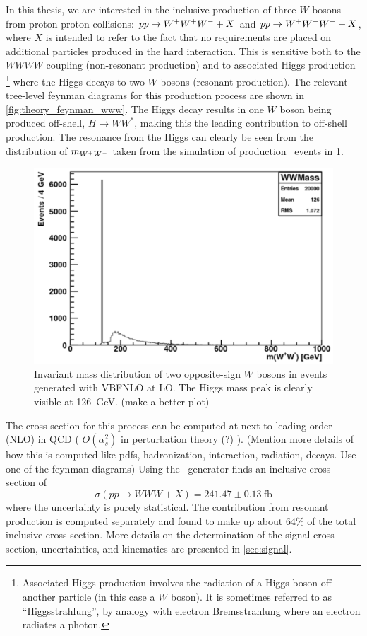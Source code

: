 In this thesis, we are interested in the inclusive production of three
$W$ bosons from proton-proton collisions:
$pp\rightarrow\- W^{+}W^{+}W^{-}+X$ and $pp\rightarrow W^{+}W^{-}W^{-}\allowbreak +X$, 
where $X$ is intended to refer to the fact that no requirements are 
placed on additional particles produced in the hard interaction.
This is sensitive both
to the $WWWW$ coupling (non-resonant production) 
and to associated Higgs production \footnote{Associated Higgs production involves
the radiation of a Higgs boson off another particle (in this case a $W$ boson). It 
is sometimes referred to as ``Higgsstrahlung'', by analogy 
with electron Bremsstrahlung where an electron radiates a photon.} where 
the Higgs decays to two
$W$ bosons (resonant production). 
The relevant
tree-level feynman diagrams for this production process are shown in 
\fig\ref{fig:theory_feynman_www}.
The Higgs decay results in one $W$ boson being produced off-shell,
$H\rightarrow WW^*$, making this the leading contribution to off-shell
production.  
The resonance from the Higgs can clearly be seen from the 
distribution of $m_{W^{+}W^{-}}$ taken from the simulation of production \www~events
in \fig\ref{fig:mww_higgs}.

\begin{figure}[ht]
\centering
\includegraphics[width=0.5\columnwidth]{figures/2l2j/mWW-parton.pdf}
\caption{ Invariant mass distribution of two opposite-sign $W$ bosons 
in \www events generated with VBFNLO at LO. The Higgs mass peak is clearly 
visible at 126~GeV. (make a better plot)}
\label{fig:mww_higgs}
\end{figure}




The cross-section for this process can be computed at 
next-to-leading-order (NLO) in QCD
( $O(\alpha_s^2)$ in perturbation theory (?) ). 
(Mention more details of how this is computed like pdfs,
hadronization, interaction, radiation, decays. Use one of the 
feynman diagrams)
Using 
the \madgraph~generator finds an inclusive cross-section of 
\begin{equation}
\sigma(pp\rightarrow WWW + X) = 241.47 \pm 0.13~\textrm{fb}
\end{equation}
where the uncertainty is purely statistical.
The contribution from resonant production is computed separately
and found to make up about 64\% of the 
total inclusive cross-section.
More details on the determination of the signal cross-section, uncertainties,
and kinematics are presented in \sec\ref{sec:signal}.

